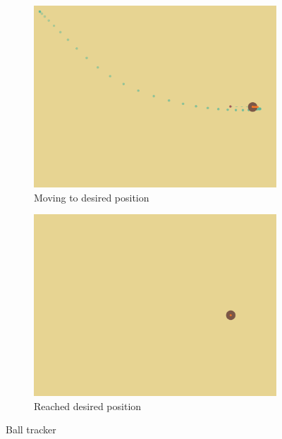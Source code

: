 \begin{figure}
	\begin{subfigure}[b]{0.80\linewidth}
		\includegraphics[trim = 0mm 110mm 0mm 0mm, clip, width=\linewidth]{figures/BallTracker-overshooting.png}
		\caption{Moving to desired position}
		\label{fig:balltracker-moving}
	\end{subfigure}
	
	\begin{subfigure}[b]{0.80\linewidth}
		\includegraphics[trim = 0mm 110mm 0mm 0mm, clip, width=\linewidth]{figures/BallTracker-desired.png}
		\caption{Reached desired position}
		\label{fig:balltracker-reached}
	\end{subfigure}
	\caption{Ball tracker}
	\label{fig:balltracker}
\end{figure}

